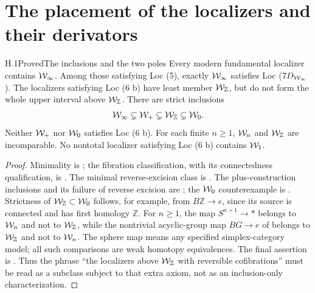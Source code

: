 \section{The placement of the localizers and their derivators}

\begin{claim}{H.1}{Proved}{The inclusions and the two poles}
Every modern fundamental localizer contains $\mathcal{W}_{\infty}$. Among those satisfying Loc (5), exactly $\mathcal{W}_{\infty}$ satisfies Loc ($7D_{\mathcal{W}_{\infty}}$). The localizers satisfying Loc (6 b) have least member $\mathcal{W}_{\mathbb Z}$, but do not form the whole upper interval above $\mathcal{W}_{\mathbb Z}$. There are strict inclusions
\[
 \mathcal{W}_{\infty}\subsetneq\mathcal{W}_+\subsetneq\mathcal{W}_{\mathbb Z}\subsetneq\mathcal{W}_0.
\]
Neither $\mathcal{W}_+$ nor $\mathcal{W}_0$ satisfies Loc (6 b). For each finite $n\geq1$, $\mathcal{W}_n$ and $\mathcal{W}_{\mathbb Z}$ are incomparable. No nontotal localizer satisfying Loc (6 b) contains $\mathcal{W}_1$.
\end{claim}
\begin{proof}
Minimality is ; the fibration classification, with its connectedness qualification, is . The minimal reverse-excision class is . The plus-construction inclusions and its failure of reverse excision are ; the $\mathcal{W}_0$ counterexample is . Strictness of $\mathcal{W}_{\mathbb Z}\subset\mathcal{W}_0$ follows, for example, from $B\mathbb Z\to e$, since its source is connected and has first homology $\mathbb Z$. For $n\geq1$, the map $S^{n+1}\to *$ belongs to $\mathcal{W}_n$ and not to $\mathcal{W}_{\mathbb Z}$, while the nontrivial acyclic-group map $BG\to e$ of  belongs to $\mathcal{W}_{\mathbb Z}$ and not to $\mathcal{W}_n$. The sphere map means any specified simplex-category model; all such comparisons are weak homotopy equivalences. The final assertion is . Thus the phrase ``the localizers above $\mathcal{W}_{\mathbb Z}$ with reversible cofibrations'' must be read as a subclass subject to that extra axiom, not as an inclusion-only characterization.
\end{proof}




